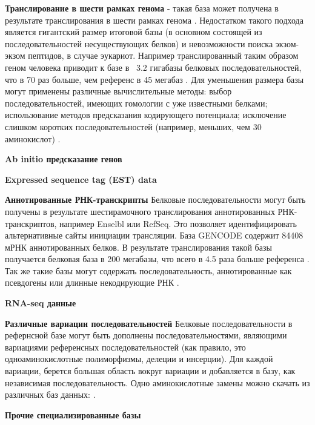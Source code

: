 \textbf{Транслирование в шести рамках генома} - такая база может получена в результате транслирования в шести рамках генома \cite{baerenfaller2008genome}. Недостатком такого подхода является гигантский размер итоговой базы (в основном состоящей из последовательностей несуществующих белков) и невозможности поиска экзом-экзом пептидов, в случае эукариот. Например транслированный таким образом геном человека приводит к базе в ~3.2 гигабазы белковых последовательностей, что в 70 раз больше, чем референс в 45 мегабаз \cite{khatun2013whole}. Для уменьшения размера базы могут применены различные вычислительные методы: выбор последовательностей, имеющих гомологии с уже известными белками; использование методов предсказания кодирующего потенциала; исключение слишком коротких последовательностей (например, меньших, чем 30 аминокислот) \cite{blakeley2012addressing}. 

\textbf{Ab initio предсказание генов} 

\textbf{Expressed sequence tag (EST) data}

\textbf{Аннотированные РНК-транскрипты} Белковые последовательности могут быть получены в результате шестирамочного транслирования аннотированных РНК-транскриптов, например Enselbl или RefSeq. Это позволяет идентифицировать альтернативные сайты инициации трансляции. База GENCODE содержит 84408 мРНК аннотированных белков. В результате транслирования такой базы получается белковая база в 200 мегабазы, что всего в 4.5 раза больше референса \cite{khatun2013whole}. Так же такие базы могут содержать последовательность, аннотированные как псевдогены или длинные некодирующие РНК \cite{derrien2012gencode}.

\textbf{RNA-seq данные}

\textbf{Различные вариации последовательностей} Белковые последовательности в рефернсной базе могут быть дополнены последовательностями, являющими вариациями референсных последовательностей (как правило, это одноаминокислотные полиморфизмы, делеции и инсерции). Для каждой вариации, берется большая область вокруг вариации и добавляется в базу, как независимая последовательность. Одно аминокислотные замены можно скачать из различных баз данных:  \cite{li2011bioinformatics}.  

\textbf{Прочие специализированные базы}

